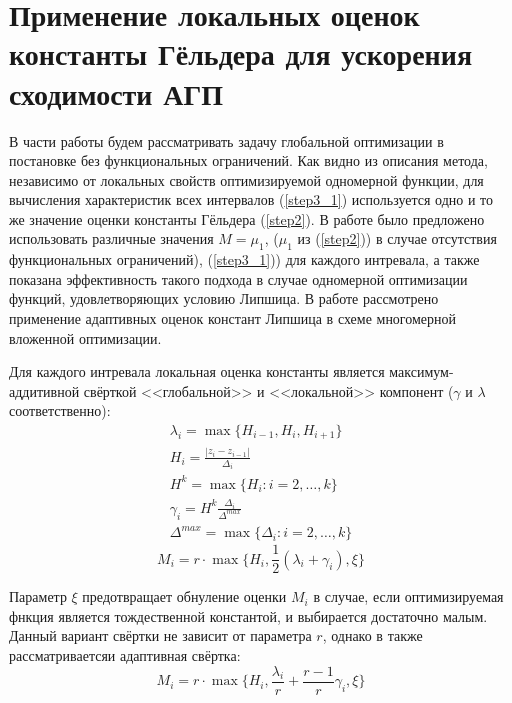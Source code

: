 \section{Применение локальных оценок константы Гёльдера для ускорения сходимости АГП}
В части работы будем рассматривать задачу глобальной оптимизации в постановке без функциональных ограничений.
Как видно из описания метода, независимо от локальных свойств оптимизируемой одномерной
функции, для вычисления характеристик всех интервалов (\ref{step3_1}) используется одно и то же
значение оценки константы Гёльдера (\ref{step2}). В работе \cite{sergLocalTuningFirst} было предложено использовать различные
значения \(M=\mu_1\), (\(\mu_1\) из (\ref{step2})) в случае отсутствия функциональных ограничений), (\ref{step3_1})) для каждого интревала, а
также показана эффективность такого подхода в случае одномерной оптимизации функций,
удовлетворяющих условию Липшица. В работе \cite{nestedLocal} рассмотрено применение
адаптивных оценок констант Липшица в схеме многомерной вложенной оптимизации.

Для каждого интревала локальная оценка константы является максимум-аддитивной свёрткой
<<глобальной>> и <<локальной>> компонент (\(\gamma\) и \(\lambda\) соответственно):
\begin{displaymath}
  \begin{array}{lr}
    \lambda_i=\max\{H_{i-1},H_i,H_{i+1}\} \\
    H_i=\frac{|z_i-z_{i-1}|}{\Delta_i} \\
    H^k=\max\{H_i:i=2,\dots ,k\} \\
    \gamma_i=H^k\frac{\Delta_i}{\Delta^{max}} \\
    \Delta^{max}=\max\{\Delta_{i}:i=2,\dots ,k\}
  \end{array}
\end{displaymath}
\begin{equation}
\label{additiveConv}
M_i=r\cdot \max\{H_i, \frac{1}{2}(\lambda_i+\gamma_i),\xi\}
\end{equation}

Параметр \(\xi\) предотвращает обнуление оценки \(M_i\) в случае, если оптимизируемая
фнкция является тождественной константой, и выбирается достаточно малым.
Данный вариант свёртки не зависит от параметра \(r\), однако в \cite{sergLocalTuning}
также рассматриваетсяи адаптивная свёртка:
\begin{equation}
\label{additiveAdaptiveConv}
M_i=r\cdot \max\{H_i, \frac{\lambda_i}{r}+\frac{r-1}{r}\gamma_i,\xi\}
\end{equation}

